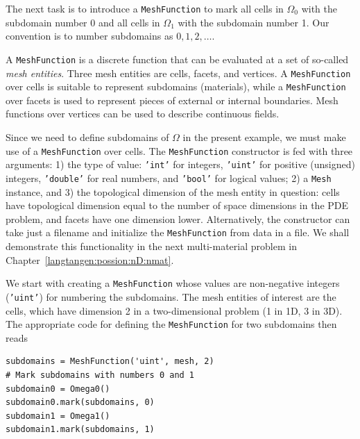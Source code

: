 The next task is to introduce a {\fontsize{12pt}{12pt}\texttt{MeshFunction}} to mark all
cells in $\Omega_0$ with the subdomain number 0 and all cells in $\Omega_1$
with the subdomain number 1.
Our convention is to number subdomains as $0,1,2,\ldots$.

A {\fontsize{12pt}{12pt}\texttt{MeshFunction}} is a discrete function that can be evaluated at a set
of so-called \emph{mesh entities}. Three mesh entities are
cells, facets, and vertices. A {\fontsize{12pt}{12pt}\texttt{MeshFunction}} over cells is suitable to
represent subdomains (materials), while a {\fontsize{12pt}{12pt}\texttt{MeshFunction}} over
facets is used to represent pieces of external or internal boundaries.
Mesh functions over vertices can be used to describe continuous fields.

Since we need to define subdomains of $\Omega$
in the present example, we must make use
of a {\fontsize{12pt}{12pt}\texttt{MeshFunction}} over cells. The
{\fontsize{12pt}{12pt}\texttt{MeshFunction}} constructor is fed with three arguments: 1) the type
of value: {\fontsize{12pt}{12pt}\texttt{'int'}} for integers, {\fontsize{12pt}{12pt}\texttt{'uint'}} for positive
(unsigned) integers, {\fontsize{12pt}{12pt}\texttt{'double'}} for real numbers, and
{\fontsize{12pt}{12pt}\texttt{'bool'}} for logical values; 2) a {\fontsize{12pt}{12pt}\texttt{Mesh}} instance, and 3)
the topological dimension of the mesh entity in question: cells
have topological dimension equal to the number of space dimensions in
the PDE problem, and facets have one dimension lower.
Alternatively, the constructor can take just a filename
and initialize the {\fontsize{12pt}{12pt}\texttt{MeshFunction}} from data in a file. We shall
demonstrate this functionality in the next multi-material problem
in Chapter~\ref{langtangen:possion:nD:nmat}.

We start with creating a {\fontsize{12pt}{12pt}\texttt{MeshFunction}} whose
values are non-negative integers ({\fontsize{12pt}{12pt}\texttt{'uint'}})
for numbering the subdomains.
The mesh entities of interest are the cells, which have dimension 2
in a two-dimensional problem (1 in 1D, 3 in 3D). The appropriate code for
defining the {\fontsize{12pt}{12pt}\texttt{MeshFunction}} for two subdomains then reads
\begin{Verbatim}[fontsize=\fontsize{10pt}{10pt},tabsize=8,baselinestretch=1.05,
fontfamily=tt,xleftmargin=7mm]
subdomains = MeshFunction('uint', mesh, 2)
# Mark subdomains with numbers 0 and 1
subdomain0 = Omega0()
subdomain0.mark(subdomains, 0)
subdomain1 = Omega1()
subdomain1.mark(subdomains, 1)
\end{Verbatim}
\noindent

